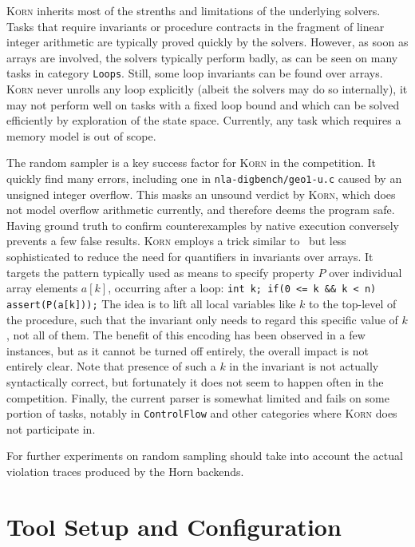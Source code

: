\documentclass{llncs}
\newcommand{\Korn}{\textsc{Korn}\xspace}
\begin{document}
\Korn inherits most of the strenths and limitations of the underlying solvers.
Tasks that require invariants or procedure contracts in the fragment of linear integer arithmetic
are typically proved quickly by the solvers.
However, as soon as arrays are involved, the solvers typically perform badly,
as can be seen on many tasks in category \texttt{Loops}.
Still, some loop invariants can be found over arrays.
\Korn never unrolls any loop explicitly (albeit the solvers may do so internally),
it may not perform well on
tasks with a fixed loop bound and which can be solved efficiently by exploration of the state space.
Currently, any task which requires a memory model is out of scope.

The random sampler is a key success factor for \Korn in the competition.
It quickly find many errors, including one in \texttt{nla-digbench/geo1-u.c} caused by an unsigned integer overflow.
This masks an unsound verdict by \Korn, which does not model overflow arithmetic currently, and therefore deems the program safe.
Having ground truth to confirm counterexamples by native execution conversely prevents a few false results.
% 
\Korn employs a trick similar to~\cite{monniaux2016cell} but less sophisticated
to reduce the need for quantifiers in invariants over arrays.
It targets the pattern typically used as means to specify property $P$ over individual array elements $a[k]$,
occurring after a loop:
\verb|int k; if(0 <= k && k < n) assert(P(a[k]));|
The idea is to lift all local variables like $k$ to the top-level of the procedure,
such that the invariant only needs to regard this specific value of $k$, not all of them.
The benefit of this encoding has been observed in a few instances,
but as it cannot be turned off entirely, the overall impact is not entirely clear.
Note that presence of such a $k$ in the invariant is not actually syntactically correct,
but fortunately it does not seem to happen often in the competition.
Finally, the current parser is somewhat limited and fails on some portion of tasks,
notably in \texttt{ControlFlow} and other categories where \Korn does not participate in.


For further experiments on random sampling should
take into account the actual violation traces produced by the Horn backends.

\section{Tool Setup and Configuration}
\label{sec:project}
\end{document}
